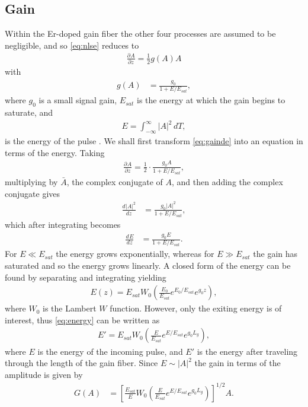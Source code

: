 \documentclass[12pt]{article}
\newcommand{\diff}[3][]{\frac{d^{#1}#2}{d{#3}^{#1}}}
\newcommand{\pdiff}[3][]{\frac{\partial^{#1}#2}{\partial{#3}^{#1}}}
\newcommand{\Es}{E_{sat}}
\begin{document}
\subsection{Gain}
Within the Er-doped gain fiber the other four processes are assumed to be negligible, and so \eqref{eq:nlse} reduces to
\begin{align}
\label{eq:gainde}
\pdiff{A}{z} = \frac{1}{2} g(A) A
\end{align}
with
\begin{align*}
g(A) &= \frac{g_0}{1 + E / \Es},
\end{align*}
where $g_0$ is a small signal gain, $\Es$ is the energy at which the gain begins to saturate, and \begin{align*}
E = \int_{-\infty}^\infty |A|^2 \, dT,
\end{align*}
is the energy of the pulse \cite{bohun, yarutkina}. We shall first transform \eqref{eq:gainde} into an equation in terms of the energy. Taking
\begin{align*}
\pdiff{A}{z} = \frac{1}{2} \cdot \frac{g_0 A}{1 + E / \Es},
\end{align*}
multiplying by $\bar{A}$, the complex conjugate of $A$, and then adding the complex conjugate gives
\begin{align*}
\diff{|A|^2}{z} &= \frac{g_0 |A|^2}{1 + E / \Es},
\end{align*}
which after integrating becomes
\begin{align*}
\diff{E}{z} &= \frac{g_0 E}{1 + E / \Es}.
\end{align*}
For $E \ll \Es$ the energy grows exponentially, whereas for $E \gg \Es$ the gain has saturated and so the energy grows linearly. A closed form of the energy can be found by separating and integrating yielding
\begin{align}
\label{eq:energy}
E(z) = \Es W_0 \left( \frac{E_0}{\Es} e^{E_0 / \Es} e^{g_0 z} \right),
\end{align}
where $W_0$ is the Lambert $W$ function. However, only the exiting energy is of interest, thus \eqref{eq:energy} can be written as
\begin{align*}
E' = \Es W_0 \left( \frac{E}{\Es} e^{E / \Es} e^{g_0 L_g} \right),
\end{align*}
where $E$ is the energy of the incoming pulse, and $E'$ is the energy after traveling through the length of the gain fiber. Since $E \sim |A|^2$ the gain in terms of the amplitude is given by
\begin{align}
\label{eq:gain}
G(A) &= \left[ \frac{\Es}{E} W_0 \left( \frac{E}{\Es} e^{E / \Es} e^{g_0 L_g} \right) \right]^{1/2} A.
\end{align}
\end{document}
